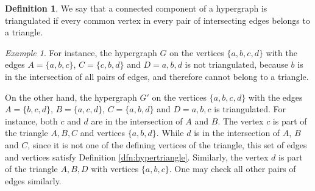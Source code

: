 \documentclass[11pt]{article}
\theoremstyle{remark}
\newtheorem{eg}[thm]{Example}
\theoremstyle{definition}
\newtheorem{dfn}[thm]{Definition}
\begin{document}
\begin{dfn}\label{dfn:triangulated}
	We say that a connected component of a hypergraph is triangulated if every common vertex in every pair of intersecting edges belongs to a triangle.
\end{dfn}

\begin{eg} \label{eg:triangulated}
	For instance, the hypergraph $G$ on the vertices $\{a, b, c, d\}$ with the edges $A = \{a, b, c\}$, $C = \{ c, b, d\}$ and $D = {a, b, d}$ is not triangulated, because $b$ is in the intersection of all pairs of edges, and therefore cannot belong to a triangle.
	
	On the other hand, the hypergraph $G'$ on the vertices $\{a, b, c, d\}$ with the edges $A = \{b, c, d\}$, $B = \{a, c, d\}$, $C = \{ a, b, d\}$ and $D = {a, b, c}$ is triangulated. For instance, both $c$ and $d$ are in the intersection of $A$ and $B$. The vertex $c$ is part of the triangle $A, B, C$ and vertices $\{a, b, d\}$. While $d$ is in the intersection of $A$, $B$ and $C$, since it is not one of the defining vertices of the triangle, this set of edges and vertices satisfy Definition \ref{dfn:hypertriangle}. Similarly, the vertex $d$ is part of the triangle $A, B, D$ with vertices $\{a, b, c\}$. One may check all other pairs of edges similarly.
\end{eg}
\end{document}
